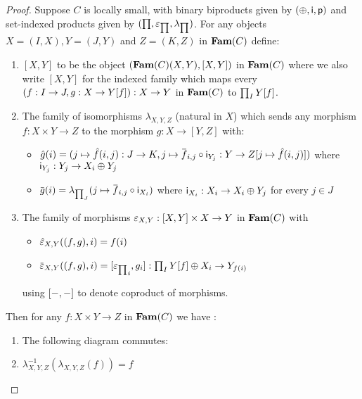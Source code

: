 \begin{proof}
Suppose $C$ is locally small, with binary biproducts given by $(\oplus,\mathsf{i},\mathsf{p})$ and set-indexed products
given by $(\prod,\varepsilon_{\prod},\lambda_{\prod})$. For any objects $X = (I, X), Y = (J, Y)$ and $Z = (K, Z)$ in
$\mathbf{Fam}(C)$ define:

\begin{enumerate}
\item $[X, Y]$ to be the object $(\mathbf{Fam}(C)(X,Y),[X, Y])$ in $\mathbf{Fam}(C)$ where we also write $[X,Y]$ for the
indexed family which maps every $(f: I \to J, g: X \to Y[f]): X \to Y$ in $\mathbf{Fam}(C)$ to
$\prod_{I}Y[f]$.
\item The family of isomorphisms $\lambda_{X,Y,Z}$ (natural in $X$) which sends any morphism $f: X \times Y
\to Z$ to the morphism $g: X \to [Y, Z]$ with:
\begin{itemize}
\item $\idxf{g}(i) = (j \mapsto \idxf{f}(i, j): J \to K, j \mapsto \famf{f}_{i,j} \comp \inj_{Y_j}: Y \to
\reindex{Z}{j \mapsto \idxf{f}(i, j)})$ where $\mathsf{i}_{Y_j}: Y_j \to X_i \oplus Y_j$
\item $\famf{g}(i) = \lambda_{\prod_{J}}(j \mapsto \famf{f}_{i, j} \comp \inj_{X_i})$ where $\mathsf{i}_{X_i}: X_i
\to X_i \oplus Y_j$ for every $j \in J$
\end{itemize}
\item The family of morphisms $\varepsilon_{X,Y}: [X, Y] \times X \to Y$ in $\mathbf{Fam}(C)$ with
\begin{itemize}
\item $\hat{\varepsilon}_{X,Y}((f, g), i) = f(i)$
\item $\famf{\eval}_{X,Y}((f, g), i) = \coprodM{{\eval_{\prod}}_i}{g_i}: \prod_{I}\reindex{Y}{f} \biprod X_i \to Y_{f(i)}$
\end{itemize}
using $[-, -]$ to denote coproduct of morphisms.
\end{enumerate}
Then for any $f: X \times Y \to Z$ in $\mathbf{Fam}(C)$ we have :
\begin{enumerate}
\item The following diagram commutes:

\begin{center}
\end{center}

\item $\lambda^{-1}_{X,Y,Z}(\lambda_{X,Y,Z}(f)) = f$
\end{enumerate}
\end{proof}
